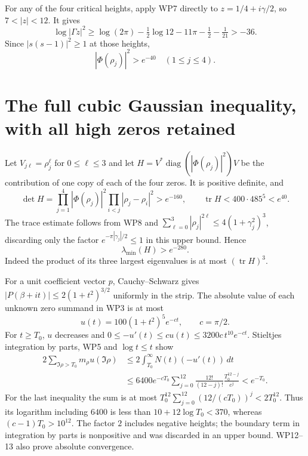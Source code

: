 \documentclass[11pt]{article}
\newcommand{\diag}{\operatorname{diag}}
\begin{document}
For any of the four critical heights, apply WP7 directly to
$z=1/4+i\gamma/2$, so $7<|z|<12$. It gives
\[
 \log|\Gamma z|^2\ge
 \log(2\pi)-\tfrac12\log12-11\pi-\tfrac12-\tfrac1{21}>-36.
\]
Since $|s(s-1)|^2\ge1$ at those heights,
\[
             |\Phi(\rho_j)|^2>e^{-40}\quad(1\le j\le4).
                                                                  \tag{WP9}
\]

\section{The full cubic Gaussian inequality, with all high zeros retained}
Let $V_{j\ell}=\rho_j^\ell$ for $0\le\ell\le3$ and let
$H=V^*\diag(|\Phi(\rho_j)|^2)V$ be the contribution of one
copy of each of the four zeros. It is positive definite, and
\[
 \det H=\prod_{j=1}^4|\Phi(\rho_j)|^2
                   \prod_{i<j}|\rho_j-\rho_i|^2>e^{-160},
 \qquad \operatorname{tr}H<400\cdot485^5<e^{40}.              \tag{WP10}
\]
The trace estimate follows from WP8 and
$\sum_{\ell=0}^3|\rho_j|^{2\ell}\le4(1+\gamma_j^2)^3$,
discarding only the factor $e^{-\pi|\gamma_j|/2}\le1$ in this
upper bound. Hence
\[
                         \lambda_{\min}(H)>e^{-280}.           \tag{WP11}
\]
Indeed the product of its three largest eigenvalues is at most
$(\operatorname{tr}H)^3$.

For a unit coefficient vector $p$, Cauchy--Schwarz gives
$|P(\beta+it)|\le2(1+t^2)^{3/2}$ uniformly in the strip.
The absolute value of each unknown zero summand in WP3 is at
most
\[
                  u(t)=100(1+t^2)^5e^{-ct},\qquad c=\pi/2.
                                                                  \tag{WP12}
\]
For $t\ge T_0$, $u$ decreases and
$0\le-u'(t)\le c u(t)\le3200c\,t^{10}e^{-ct}$.
Stieltjes integration by parts, WP5 and $\log t\le t$ show
\[
 \begin{split}
 2\sum_{\Im\rho>T_0}m_\rho u(\Im\rho)
 &\le2\int_{T_0}^{\infty}N(t)(-u'(t))\,dt\\
 &\le6400e^{-cT_0}\sum_{j=0}^{12}
             \frac{12!}{(12-j)!}\frac{T_0^{12-j}}{c^j}
 <e^{-T_0}.
 \end{split}                                                   \tag{WP13}
\]
For the last inequality the sum is at most
$T_0^{12}\sum_{j=0}^{12}(12/(cT_0))^j<2T_0^{12}$.
Thus its logarithm including $6400$ is less than
$10+12\log T_0<370$, whereas $(c-1)T_0>10^{12}$.
The factor $2$ includes negative heights; the boundary term in
integration by parts is nonpositive and was discarded in an
upper bound. WP12--13 also prove absolute convergence.
\end{document}
